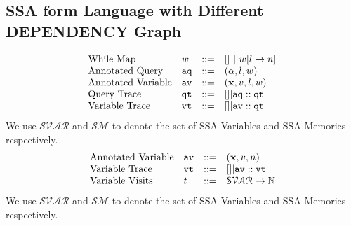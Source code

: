 \subsection{SSA form Language with Different DEPENDENCY Graph}
\[
\begin{array}{llll}
%
\mbox{While Map} 
& w & ::= & [] ~|~  w[l \to n]
\\
%
\mbox{Annotated Query} 
& \aq & ::= & (\qval, l , w )
\\
%
\mbox{Annotated Variable} 
& \av & ::= & (\ssa{x}, v, l , w )
\\
%
\mbox{Query Trace} & \qtrace
& ::= & [] | \aq :: \qtrace
\\
%
\mbox{Variable Trace} & \vtrace
& ::= & [] | \av :: \qtrace
\end{array}
\]
%
We use $\mathcal{SVAR}$ and $\mathcal{SM}$ to denote the set of SSA Variables and SSA Memories respectively.
%
\[
\begin{array}{llll}
%
\mbox{Annotated Variable} 
& \av & ::= & (\ssa{x}, v, n)
\\
%
\mbox{Variable Trace} & \vtrace
& ::= & [] | \av :: \vtrace
\\
%
\mbox{Variable Visits} & t
& ::= & \mathcal{SVAR} \to \mathbb{N}
\end{array}
\]
%
We use $\mathcal{SVAR}$ and $\mathcal{SM}$ to denote the set of SSA Variables and SSA Memories respectively.

